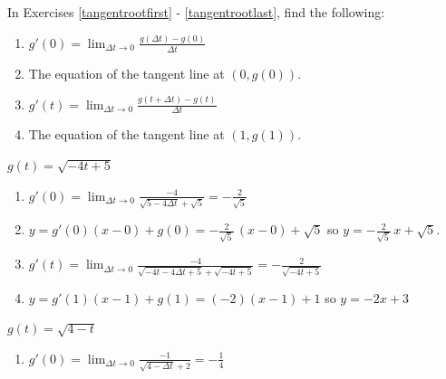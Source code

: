\documentclass{ximera}
\begin{document}
\begin{question}
In Exercises \ref{tangentrootfirst} - \ref{tangentrootlast},  find the following:

\begin{enumerate}

\item  $g'(0) = \lim_{\Delta t \rightarrow 0} \frac{g(\Delta t) - g(0)}{\Delta t}$

\item  The equation of the tangent line at $(0, g(0))$.

\item  $g'(t) =  \lim_{\Delta t \rightarrow 0} \frac{g(t+\Delta t) - g(t)}{\Delta t}$

\item  The equation of the tangent line at $(1, g(1))$.

\end{enumerate}

\begin{problem} \label{tangentrootfirst}  $g(t) = \sqrt{-4t+5}$

\begin{solution}
\begin{enumerate}

\item  $g'(0) = \lim_{\Delta t \rightarrow 0} \frac{-4}{\sqrt{5-4\Delta t} + \sqrt{5}}  = - \frac{2}{\sqrt{5}}$

\item  $y = g'(0) (x - 0) + g(0) =  -\frac{2}{\sqrt{5}} \, (x-0) + \sqrt{5}$ so $y = -\frac{2}{\sqrt{5}} \, x + \sqrt{5}$.

\item  $g'(t) = \lim_{\Delta t \rightarrow 0} \frac{-4}{\sqrt{-4t-4\Delta t+5} + \sqrt{-4t+5}} =   -\frac{2}{\sqrt{-4t+5}}$

\item  $y = g'(1)(x-1)+g(1) = (-2)(x-1) + 1$ so $y = -2x+3$

\end{enumerate}
\end{solution}
\end{problem}

\begin{problem} \label{tangentrootlast} $g(t) = \sqrt{4-t}$

\begin{solution}
 \begin{enumerate}

\item  $g'(0) = \lim_{\Delta t \rightarrow 0} \frac{-1}{\sqrt{4-\Delta t} + 2}  = - \frac{1}{4}$


\end{enumerate}
\end{solution}
\end{problem}
\end{question}
\end{document}

